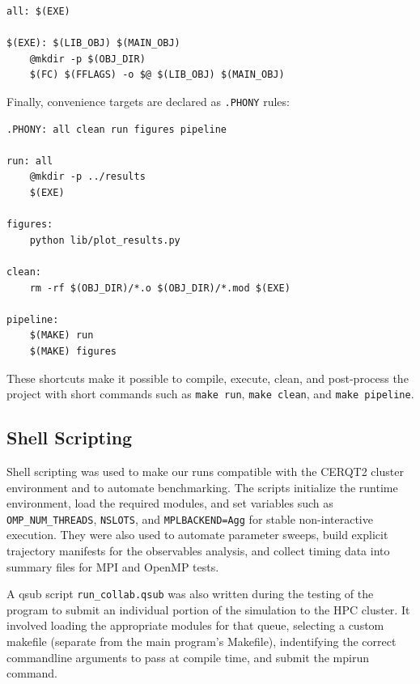 \begin{verbatim}
all: $(EXE)

$(EXE): $(LIB_OBJ) $(MAIN_OBJ)
    @mkdir -p $(OBJ_DIR)
    $(FC) $(FFLAGS) -o $@ $(LIB_OBJ) $(MAIN_OBJ)
\end{verbatim}

Finally, convenience targets are declared as \texttt{.PHONY} rules:

\begin{verbatim}
.PHONY: all clean run figures pipeline

run: all
    @mkdir -p ../results
    $(EXE)

figures:
    python lib/plot_results.py

clean:
    rm -rf $(OBJ_DIR)/*.o $(OBJ_DIR)/*.mod $(EXE)

pipeline:
    $(MAKE) run
    $(MAKE) figures
\end{verbatim}

These shortcuts make it possible to compile, execute, clean, and post-process the project with short commands such as \texttt{make run}, \texttt{make clean}, and \texttt{make pipeline}.

\subsection{Shell Scripting}\label{shell-scripting}

Shell scripting was used to make our runs compatible with the CERQT2
cluster environment and to automate benchmarking. The scripts
initialize the runtime environment, load the required modules, and set
variables such as \texttt{OMP\_NUM\_THREADS}, \texttt{NSLOTS}, and
\texttt{MPLBACKEND=Agg} for stable non-interactive execution. They were
also used to automate parameter sweeps, build explicit trajectory
manifests for the observables analysis, and collect timing data into
summary files for MPI and OpenMP tests.

A qsub script \texttt{run\_collab.qsub} was also written during the
testing of the program to submit an individual portion of the simulation
to the HPC cluster. It involved loading the appropriate modules for that
queue, selecting a custom makefile (separate from the main program's
Makefile), indentifying the correct commandline arguments to pass at
compile time, and submit the mpirun command.